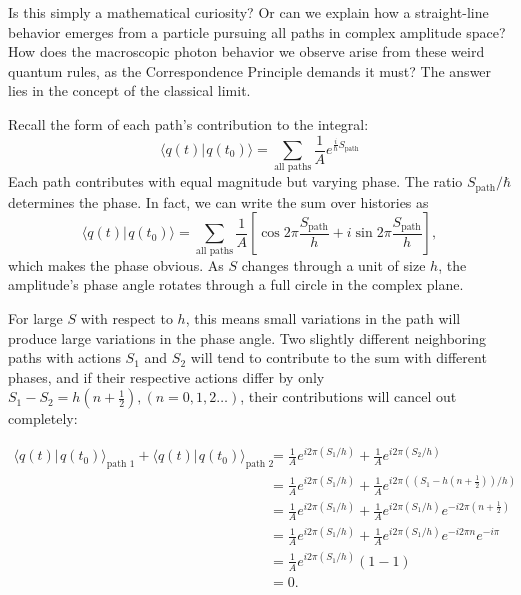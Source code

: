 \documentclass{amsart}
\newcommand{\ket}[1]{\vert \hspace{1pt}#1\rangle}
\newcommand{\braket}[2]{\langle #1 \ket{#2}}
\newcommand{\qv}{q}
\begin{document}
Is this simply a mathematical curiosity?  Or can we explain how a straight-line behavior emerges from a particle pursuing all paths in complex amplitude space?  How does the macroscopic photon behavior we observe arise from these weird quantum rules, as the Correspondence Principle demands it must?  The answer lies in the concept of the classical limit.

Recall the form of each path's contribution to the integral:
\begin{equation*}
\braket{\qv(t)}{\qv(t_0)} = \sum_{\text{all paths}} \frac{1}{A} e^{\frac{i}{\hbar}S_{\text{path}}}
\end{equation*}
Each path contributes with equal magnitude but varying phase.  The ratio $S_{\text{path}}/\hbar$ determines the phase.  In fact, we can write the sum over histories as
\begin{equation*}
\braket{\qv(t)}{\qv(t_0)} = \sum_{\text{all paths}} \frac{1}{A} \left[\cos{2 \pi \frac{S_{\text{path}}}{h}} + i \sin{2 \pi \frac{S_{\text{path}}}{h}}\right],
\end{equation*}
which makes the phase obvious.  As $S$ changes through a unit of size $h$, the amplitude's phase angle rotates through a full circle in the complex plane.

For large $S$ with respect to $h$, this means small variations in the path will produce large variations in the phase angle.  Two slightly different neighboring paths with actions $S_1$ and $S_2$ will tend to contribute to the sum with different phases, and if their respective actions differ by only $S_1 - S_2 = h(n +\frac{1}{2}), (n=0,1,2\ldots)$, their contributions will cancel out completely:

\begin{align*}
\braket{\qv(t)}{\qv(t_0)}_{\text{path 1}} + \braket{\qv(t)}{\qv(t_0)}_{\text{path 2}}
&=\frac{1}{A} e^{i 2 \pi (S_1/h)} + \frac{1}{A} e^{i 2 \pi (S_2/h)} \\
&= \frac{1}{A} e^{i 2 \pi(S_1/h)} + \frac{1}{A} e^{i 2 \pi ((S_1 - h(n +\frac{1}{2}))/h)} \\
&= \frac{1}{A} e^{i 2 \pi (S_1/h)} + \frac{1}{A}e^{i 2 \pi (S_1/h)}e^{- i 2 \pi (n +\frac{1}{2})} \\
&= \frac{1}{A} e^{i 2 \pi (S_1/h)} + \frac{1}{A}e^{i 2 \pi (S_1/h)}e^{- i 2 \pi n}e^{-i \pi} \\
&= \frac{1}{A} e^{i 2 \pi (S_1/h)}\left( 1 - 1 \right) \\
&= 0.
\end{align*}
\end{document}

